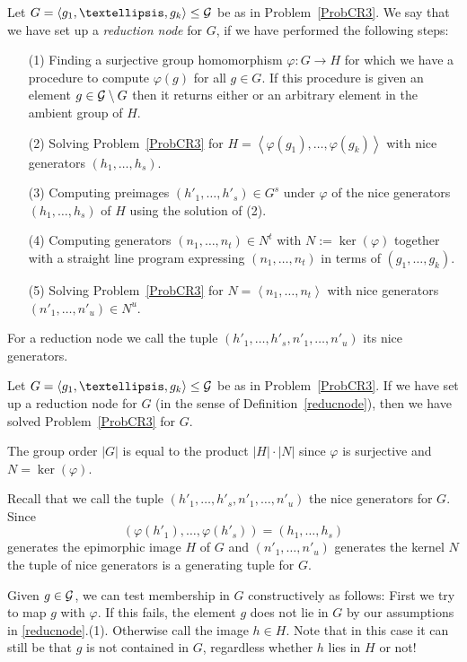 \begin{Def}
\label{reducnode}
Let $G = \left< g_1, \ldots, g_k \right> \le \GG$ be as in 
Problem~\ref{ProbCR3}.
We say that we have set up a \emph{reduction node} for $G$, if we have
performed the following steps:
\begin{itemize}
\item[(1)] Finding a surjective group homomorphism $\varphi : G \to H$ for
which we have a procedure to compute $\varphi(g)$ for all $g \in G$.
If this procedure is given an element $g \in \mathcal{G} \setminus G$ then it
returns either {\fail} or an arbitrary element in the ambient group of $H$.
\item[(2)] Solving Problem~\ref{ProbCR3} for $H = \left< \varphi(g_1),
\ldots, \varphi(g_k) \right>$ with nice generators $(h_1, \ldots, h_s)$.
\item[(3)] Computing preimages $(h'_1, \ldots, h'_s) \in G^s$ under $\varphi$
of the nice generators $(h_1, \ldots, h_s)$ of $H$ using the solution
of (2).
\item[(4)] Computing generators $(n_1, \ldots, n_t) \in N^t$ with $N :=
\ker(\varphi)$ together with a straight line program expressing
$(n_1, \ldots, n_t)$ in terms of $(g_1, \ldots, g_k)$.
\item[(5)] Solving Problem~\ref{ProbCR3} for $N = \left< n_1, \ldots, n_t
\right>$ with nice generators $(n'_1, \ldots, n'_u) \in N^u$.
\end{itemize}
For a reduction node we call the tuple $(h'_1, \ldots, h'_s, n'_1, \ldots,
n'_u)$ its nice generators.
\end{Def}

\begin{Prop}
Let $G = \left< g_1, \ldots, g_k \right> \le \GG$ be as in 
Problem~\ref{ProbCR3}.
If we have set up a reduction node for $G$ (in the sense of
Definition~\ref{reducnode}), then we have solved
Problem~\ref{ProbCR3} for $G$.
\end{Prop}
\proofbeg
The group order $|G|$ is equal to the product $|H| \cdot |N|$ since
$\varphi$ is surjective and $N = \ker(\varphi)$.

Recall that we call the tuple $(h'_1, \ldots, h'_s, n'_1, \ldots, n'_u)$
the nice generators for $G$. Since 
\[ (\varphi(h'_1), \ldots, \varphi(h'_s))
= (h_1, \ldots, h_s) \] 
generates the epimorphic image $H$ of $G$ and
$(n'_1, \ldots, n'_u)$ generates the kernel $N$ the tuple of nice
generators is a generating tuple for $G$.

Given $g \in \mathcal{G}$, we can test membership in $G$ constructively as follows:
First we try to map $g$ with $\varphi$. If this fails, the element $g$
does not lie in $G$ by our assumptions in \ref{reducnode}.(1). Otherwise
call the image $h \in H$. Note that in this case it can still be that
$g$ is not contained in $G$, regardless whether $h$ lies in $H$ or not! 


